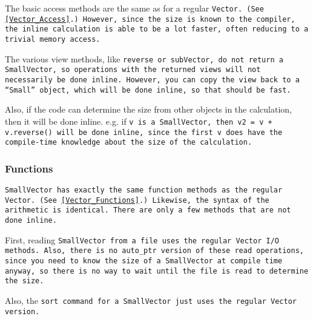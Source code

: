 The basic access methods are the same as for a regular \tt{Vector}.
(See \ref{Vector_Access}.)
However, since the size is known to the compiler, the inline calculation is able
to be a lot faster, often reducing to a trivial memory access.

The various view methods, like \tt{reverse} or \tt{subVector},
do not return a \tt{SmallVector}, so operations 
with the returned views will not necessarily be done inline.
However, you can copy the view back to a ``\tt{Small}'' object, which will be done 
inline, so that should be fast.

Also, if the code can determine the size from other objects in the calculation, then
it will be done inline.  e.g. if \tt{v} is a \tt{SmallVector}, then 
\tt{v2 = v + v.reverse()} will be done inline, since the first \tt{v} does have 
the compile-time knowledge about the size of the calculation.

\subsubsection{Functions}
\label{SmallVector_Functions}

\tt{SmallVector} has exactly the same
function methods as the regular \tt{Vector}.  
(See \ref{Vector_Functions}.)
Likewise, the syntax of the
arithmetic is identical.  There are only a few methods that 
are not done inline.  

First, reading \tt{SmallVector} from a file 
uses the regular
\tt{Vector} I/O methods.  Also, there is no \tt{auto\_ptr} 
version of these read operations, since you need to know the 
size of a \tt{SmallVector} at compile time anyway, 
so there is no way to wait until the file is read to determine the size.

Also, the \tt{sort} command for a \tt{SmallVector} just uses the
regular \tt{Vector} version.

